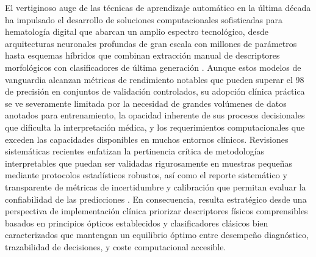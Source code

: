El vertiginoso auge de las técnicas de aprendizaje automático en la última década ha impulsado el desarrollo de soluciones computacionales sofisticadas para hematología digital que abarcan un amplio espectro tecnológico, desde arquitecturas neuronales profundas de gran escala con millones de parámetros hasta esquemas híbridos que combinan extracción manual de descriptores morfológicos con clasificadores de última generación \cite{OConnor2020,Sazak2024,Alzubaidi2020}. Aunque estos modelos de vanguardia alcanzan métricas de rendimiento notables que pueden superar el 98 de precisión en conjuntos de validación controlados, su adopción clínica práctica se ve severamente limitada por la necesidad de grandes volúmenes de datos anotados para entrenamiento, la opacidad inherente de sus procesos decisionales que dificulta la interpretación médica, y los requerimientos computacionales que exceden las capacidades disponibles en muchos entornos clínicos. Revisiones sistemáticas recientes enfatizan la pertinencia crítica de metodologías interpretables que puedan ser validadas rigurosamente en muestras pequeñas mediante protocolos estadísticos robustos, así como el reporte sistemático y transparente de métricas de incertidumbre y calibración que permitan evaluar la confiabilidad de las predicciones \cite{Vabalas2019,Tsamardinos2022,Montero2024}. En consecuencia, resulta estratégico desde una perspectiva de implementación clínica priorizar descriptores físicos comprensibles basados en principios ópticos establecidos y clasificadores clásicos bien caracterizados que mantengan un equilibrio óptimo entre desempeño diagnóstico, trazabilidad de decisiones, y coste computacional accesible.

